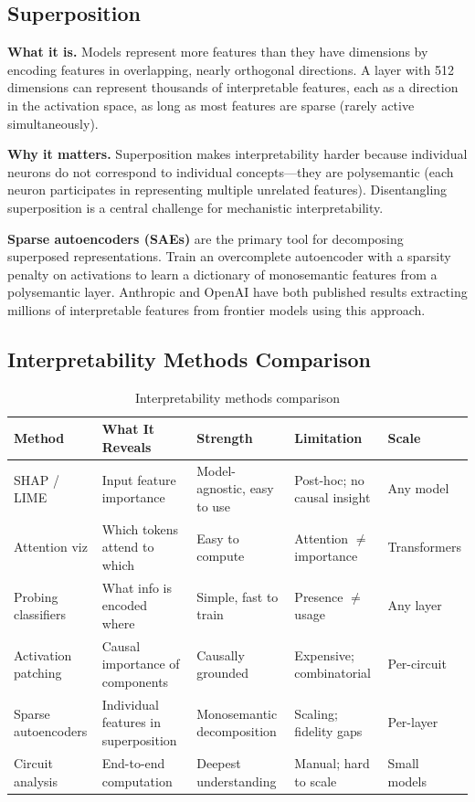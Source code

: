\subsection{Superposition}

\textbf{What it is.} Models represent more features than they have dimensions by encoding features in overlapping, nearly orthogonal directions. A layer with 512 dimensions can represent thousands of interpretable features, each as a direction in the activation space, as long as most features are sparse (rarely active simultaneously).

\textbf{Why it matters.} Superposition makes interpretability harder because individual neurons do not correspond to individual concepts---they are polysemantic (each neuron participates in representing multiple unrelated features). Disentangling superposition is a central challenge for mechanistic interpretability.

\textbf{Sparse autoencoders (SAEs)} are the primary tool for decomposing superposed representations. Train an overcomplete autoencoder with a sparsity penalty on activations to learn a dictionary of monosemantic features from a polysemantic layer. Anthropic and OpenAI have both published results extracting millions of interpretable features from frontier models using this approach.

\subsection{Interpretability Methods Comparison}

\begin{table}[H]
\centering
\caption{Interpretability methods comparison}
\begin{tabularx}{\textwidth}{lXXXl}
\toprule
\textbf{Method} & \textbf{What It Reveals} & \textbf{Strength} & \textbf{Limitation} & \textbf{Scale} \\
\midrule
SHAP / LIME & Input feature importance & Model-agnostic, easy to use & Post-hoc; no causal insight & Any model \\
Attention viz & Which tokens attend to which & Easy to compute & Attention $\neq$ importance & Transformers \\
Probing classifiers & What info is encoded where & Simple, fast to train & Presence $\neq$ usage & Any layer \\
Activation patching & Causal importance of components & Causally grounded & Expensive; combinatorial & Per-circuit \\
Sparse autoencoders & Individual features in superposition & Monosemantic decomposition & Scaling; fidelity gaps & Per-layer \\
Circuit analysis & End-to-end computation & Deepest understanding & Manual; hard to scale & Small models \\
\bottomrule
\end{tabularx}
\end{table}

